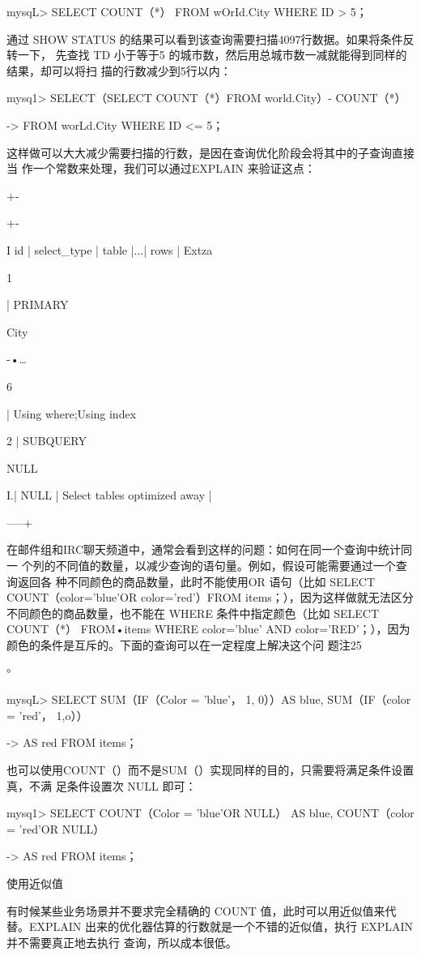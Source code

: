mysqL> SELECT COUNT（*） FROM wOrId.City WHERE ID > 5；

通过 SHOW STATUS 的结果可以看到该查询需要扫描4097行数据。如果将条件反转一下，
先查找 TD 小于等于5 的城市数，然后用总城市数一减就能得到同样的结果，却可以将扫
描的行数减少到5行以内：

mysq1> SELECT（SELECT COUNT（*）FROM world.City）- COUNT（*）

-> FROM worLd.City WHERE ID <= 5；

这样做可以大大减少需要扫描的行数，是因在查询优化阶段会将其中的子查询直接当
作一个常数来处理，我们可以通过EXPLAIN 来验证这点：

+-

+-

I id | select\_type | table |...| rows | Extza

1

| PRIMARY

City

-•…

6

| Using where;Using index

2 | SUBQUERY

NULL

I.| NULL | Select tables optimized away |

-----+

在邮件组和IRC聊天频道中，通常会看到这样的问题：如何在同一个查询中统计同一
个列的不同值的数量，以减少查询的语句量。例如，假设可能需要通过一个查询返回各
种不同颜色的商品数量，此时不能使用OR 语句（比如 SELECT COUNT（color='blue'OR
color='red'）FROM items；），因为这样做就无法区分不同颜色的商品数量，也不能在
WHERE 条件中指定颜色（比如 SELECT COUNT（*） FROM•items WHERE color='blue' AND
color='RED'；），因为颜色的条件是互斥的。下面的查询可以在一定程度上解决这个问
题注25

°

mysqL> SELECT SUM（IF（Color = 'blue'， 1, 0））AS blue, SUM（IF（color = 'red'， 1,o））

-> AS red FROM items；

也可以使用COUNT（）而不是SUM（）实现同样的目的，只需要将满足条件设置真，不满
足条件设置次 NULL 即可：

mysq1> SELECT COUNT（Color = 'blue'OR NULL） AS blue, COUNT（color = 'red'OR NULL）

-> AS red FROM items；

使用近似值

有时候某些业务场景并不要求完全精确的 COUNT 值，此时可以用近似值来代替。EXPLAIN
出来的优化器估算的行数就是一个不错的近似值，执行 EXPLAIN并不需要真正地去执行
查询，所以成本很低。

